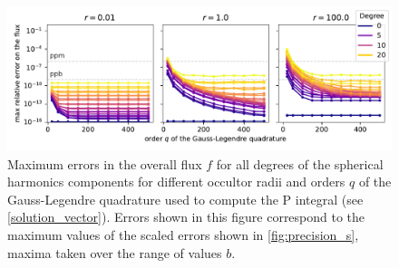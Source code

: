 \documentclass[modern]{aastex631}
\begin{document}
\begin{figure}[H]
    \begin{center}
        \includegraphics[width=\textwidth]{../workflows/precision/figures/error_order_degree.pdf}
        \caption{Maximum errors in the overall flux $f$ for all degrees of the spherical harmonics components for different occultor radii and orders $q$ of the Gauss-Legendre quadrature used to compute the P integral (see \autoref{solution_vector}). Errors shown in this figure correspond to the maximum values of the scaled errors shown in \autoref{fig:precision_s}, maxima taken over the range of values $b$.}
        \label{fig:precision_order_gausslegendre_degree}
    \end{center}
\end{figure}
\end{document}
